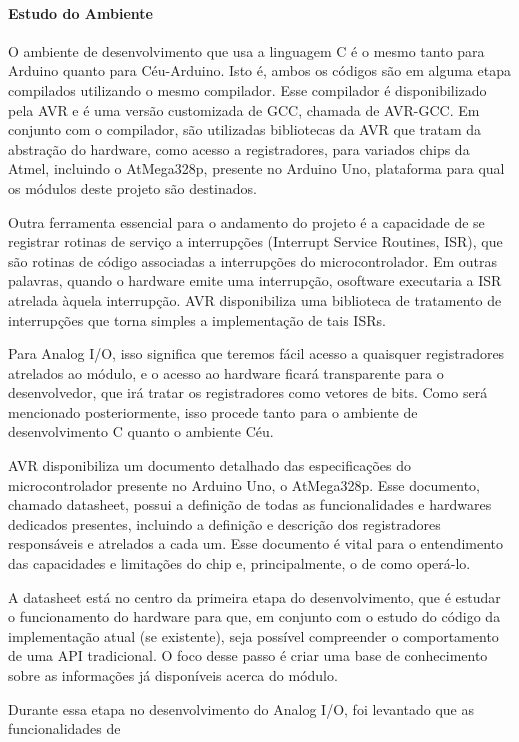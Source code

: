 \documentclass{article}
\begin{document}
\paragraph{Estudo do Ambiente}

\tab O ambiente de desenvolvimento que usa a linguagem C é o mesmo tanto para Arduino quanto para
Céu-Arduino. Isto é, ambos os códigos são em alguma etapa compilados utilizando o mesmo
compilador. Esse compilador é disponibilizado pela AVR e é uma versão customizada de GCC,
chamada de AVR-GCC. Em conjunto com o compilador, são utilizadas bibliotecas da AVR que
tratam da abstração do hardware, como acesso a registradores, para variados chips da Atmel, incluindo
o AtMega328p, presente no Arduino Uno, plataforma para qual os módulos deste projeto são
destinados.
\par Outra ferramenta essencial para o andamento do projeto é a capacidade de se registrar rotinas de
serviço a interrupções (Interrupt Service Routines, ISR), que são rotinas de código associadas a
interrupções do microcontrolador. Em outras palavras, quando o hardware emite uma interrupção, osoftware executaria a ISR atrelada àquela interrupção. AVR disponibiliza uma biblioteca de tratamento
de interrupções que torna simples a implementação de tais ISRs.
\par Para Analog I/O, isso significa que teremos fácil acesso a quaisquer registradores atrelados ao
módulo, e o acesso ao hardware ficará transparente para o desenvolvedor, que irá tratar os
registradores como vetores de bits. Como será mencionado posteriormente, isso procede tanto para
o ambiente de desenvolvimento C quanto o ambiente Céu.
\par AVR disponibiliza um documento detalhado \cite{wortmann2015} das especificações do microcontrolador presente no
Arduino Uno, o AtMega328p. Esse documento, chamado datasheet, possui a definição de todas as
funcionalidades e hardwares dedicados presentes, incluindo a definição e descrição dos registradores
responsáveis e atrelados a cada um. Esse documento é vital para o entendimento das capacidades e
limitações do chip e, principalmente, o de como operá-lo.
\par A datasheet está no centro da primeira etapa do desenvolvimento, que é estudar o funcionamento do
hardware para que, em conjunto com o estudo do código da implementação atual (se existente), seja
possível compreender o comportamento de uma API tradicional. O foco desse passo é criar uma
base de conhecimento sobre as informações já disponíveis acerca do módulo.
\par Durante essa etapa no desenvolvimento do Analog I/O, foi levantado que as funcionalidades de
\end{document}
